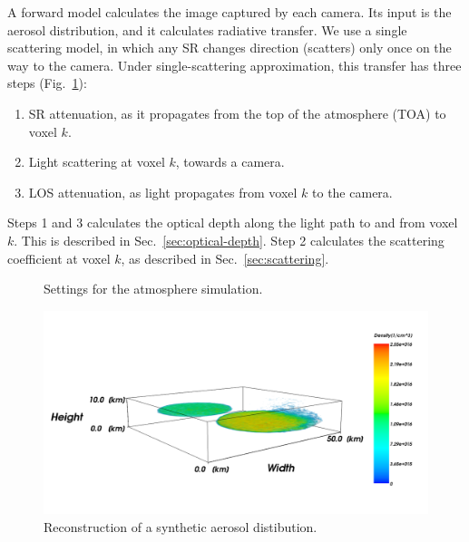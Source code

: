 \documentclass[10pt,twocolumn,letterpaper]{article}
\begin{document}
A forward model calculates the image captured by each camera.
Its input is the aerosol distribution, and it calculates radiative
transfer. We use a single scattering model, in which any SR changes direction (scatters)
only once on the way to the camera.
Under single-scattering approximation, this transfer has three steps (Fig.~\ref{fig:settings}):
\begin{enumerate}
\item SR attenuation, as it propagates from the top of the atmosphere
  (TOA) to voxel $k$.
\item Light scattering at voxel $k$, towards a camera.
\item LOS attenuation, as light propagates from voxel $k$ to the camera.
\end{enumerate}
Steps 1 and 3 calculates the optical depth
along the light path to and from voxel $k$. This is described in Sec.~\ref{sec:optical-depth}.
Step 2 calculates the scattering coefficient at voxel $k$,
as described in Sec.~\ref{sec:scattering}.


\begin{figure}
  \centering {}
  
  \caption[Settings of the atmosphere simulation]{Settings for the
    atmosphere simulation.}
  \label{fig:settings}
\end{figure}




\begin{figure}
  \centering
    \includegraphics[width=\columnwidth]{images/front.png}
    \caption{Reconstruction of a synthetic aerosol distibution.}
  \label{fig:front}
\end{figure}
\end{document}
